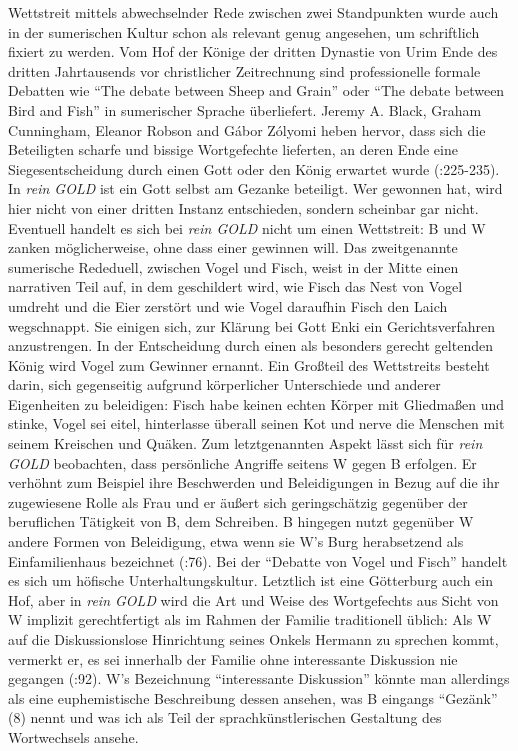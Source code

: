 \documentclass[fontsize=12pt]{scrartcl}
\begin{document}
Wettstreit mittels abwechselnder Rede zwischen zwei Standpunkten wurde auch in der sumerischen Kultur schon als relevant genug angesehen, um schriftlich fixiert zu werden. Vom Hof der K\"onige der dritten Dynastie von Urim Ende des dritten Jahrtausends vor christlicher Zeitrechnung sind professionelle formale Debatten wie "`The debate between Sheep and Grain"' oder "`The debate between Bird and Fish"' in sumerischer Sprache \"uberliefert. Jeremy A. Black, Graham Cunningham, Eleanor Robson and G\'{a}bor Z\'{o}lyomi heben hervor, dass sich die Beteiligten scharfe und bissige Wortgefechte lieferten, an deren Ende eine Siegesentscheidung durch einen Gott oder den K\"onig erwartet wurde (\cite{Blacketal2004}:225-235). In \textit{rein GOLD} ist ein Gott \mbox{selbst} am Gezanke beteiligt. Wer gewonnen hat, wird \mbox{hier} nicht von einer dritten Instanz entschieden, sondern scheinbar gar nicht. Eventuell handelt es sich bei \textit{rein GOLD} nicht um einen Wettstreit: B und W zanken m\"oglicherweise, ohne dass einer\textsuperscript{\tiny *} gewinnen will. Das zweitgenannte sumerische Rededuell, zwischen Vogel und Fisch, weist in der Mitte einen narrativen Teil auf, in dem geschildert wird, wie Fisch das Nest von Vogel umdreht und die Eier zerst\"ort und wie Vogel daraufhin Fisch den Laich wegschnappt. Sie einigen sich, zur Kl\"arung bei Gott Enki ein Gerichtsverfahren anzustrengen. In der Entscheidung durch einen als besonders gerecht geltenden K\"onig wird Vogel zum Gewinner ernannt. Ein Gro{\ss}teil des Wettstreits be\-steht darin, sich gegensei\-tig aufgrund k\"orperlicher Unterschiede und an\-de\-rer Eigenhei\-ten zu beleidigen: Fisch habe keinen echten K\"orper mit Gliedma{\ss}en und stinke, Vogel sei eitel, hinterlasse \"uberall seinen Kot und nerve die Menschen mit seinem Kreischen und Qu\"aken. Zum letztgenannten Aspekt l\"asst sich f\"ur \textit{rein GOLD} beobachten, dass pers\"onliche Angriffe sei\-tens W gegen B erfolgen. Er verh\"ohnt zum Beispiel ihre Beschwerden und Beleidigungen in Bezug auf die ihr zugewiesene Rolle als Frau und er \"au{\ss}ert sich geringsch\"atzig gegen\"uber der beruflichen T\"atigkeit von B, dem Schrei\-ben. B hingegen nutzt gegen\"uber W andere Formen von Beleidigung, etwa wenn sie W's Burg herabsetzend als Einfamilienhaus be\-zeichnet (\cite{Vill2013}:76). Bei der "`Debatte von Vogel und Fisch"' handelt es sich um h\"ofische Unterhaltungskultur. Letzt\-lich ist eine G\"otterburg auch ein Hof, aber in \textit{rein GOLD} wird die Art und Weise des Wortgefechts aus Sicht von W implizit gerechtfertigt als im Rahmen der Familie traditionell \"ublich: Als W auf die Dis\-kus\-si\-onslose Hinrichtung seines Onkels Hermann zu sprechen kommt, vermerkt er, es sei innerhalb der Familie ohne interessante Dis\-kus\-si\-on nie gegangen (\cite{Jelinek2013}:92). W's Be\-zeichnung "`interessante Dis\-kus\-si\-on"' k\"onnte man al\-ler\-dings als eine euphemistische Beschreibung dessen ansehen, was B eingangs "`Gez\"ank"' (8) \mbox{nennt} und was ich als Teil der sprachk\"unstlerischen Gestaltung des Wortwechsels ansehe.
\end{document}
